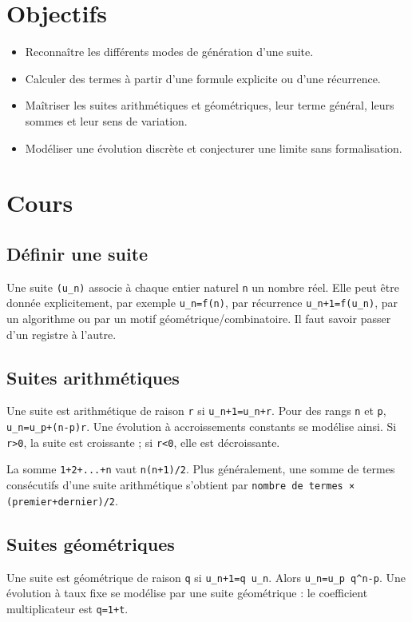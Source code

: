 \section{Objectifs}

\begin{itemize}
\item Reconnaître les différents modes de génération d'une suite.
\item Calculer des termes à partir d'une formule explicite ou d'une récurrence.
\item Maîtriser les suites arithmétiques et géométriques, leur terme général, leurs sommes et leur sens de variation.
\item Modéliser une évolution discrète et conjecturer une limite sans formalisation.
\end{itemize}

\section{Cours}

\subsection{Définir une suite}
Une suite \texttt{(u_n)} associe à chaque entier naturel \texttt{n} un nombre réel. Elle peut être donnée explicitement, par exemple \texttt{u_n=f(n)}, par récurrence \texttt{u_{n+1}=f(u_n)}, par un algorithme ou par un motif géométrique/combinatoire. Il faut savoir passer d'un registre à l'autre.

\subsection{Suites arithmétiques}
Une suite est arithmétique de raison \texttt{r} si \texttt{u_{n+1}=u_n+r}. Pour des rangs \texttt{n} et \texttt{p}, \texttt{u_n=u_p+(n-p)r}. Une évolution à accroissements constants se modélise ainsi. Si \texttt{r>0}, la suite est croissante ; si \texttt{r<0}, elle est décroissante.

La somme \texttt{1+2+...+n} vaut \texttt{n(n+1)/2}. Plus généralement, une somme de termes consécutifs d'une suite arithmétique s'obtient par \texttt{nombre de termes × (premier+dernier)/2}.

\subsection{Suites géométriques}
Une suite est géométrique de raison \texttt{q} si \texttt{u_{n+1}=q u_n}. Alors \texttt{u_n=u_p q^{n-p}}. Une évolution à taux fixe se modélise par une suite géométrique : le coefficient multiplicateur est \texttt{q=1+t}.

